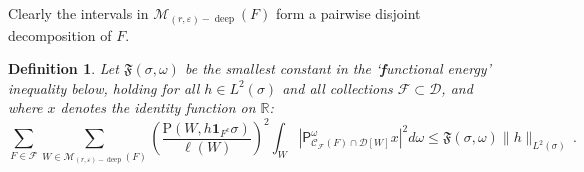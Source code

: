 \documentclass{amsart}%
\theoremstyle{plain}
\newtheorem{definition}[theorem]{Definition}
\numberwithin{equation}{section}
\begin{document}
Clearly the intervals in $\mathcal{M}_{\left(  r,\varepsilon\right)
-\operatorname*{deep}}\left(  F\right)  $ form a pairwise disjoint
decomposition of $F $.

\begin{definition}
Let $\mathfrak{F}\left(  \sigma,\omega\right)  $ be the smallest constant in
the `\textbf{f}unctional energy' inequality below, holding for all $h\in
L^{2}\left(  \sigma\right)  $ and all collections $\mathcal{F}\subset
\mathcal{D}$, and where $x$ denotes the identity function on $\mathbb{R}$:
\begin{equation}
\sum_{F\in\mathcal{F}}\sum_{W\in\mathcal{M}_{\left(  r,\varepsilon\right)
-\operatorname*{deep}}\left(  F\right)  }\left(  \frac{\mathrm{P}\left(
W,h\mathbf{1}_{F^{c}}\sigma\right)  }{\ell\left(  W\right)  }\right)  ^{2}%
\int_{W}\left\vert \mathsf{P}_{\mathcal{C}_{\mathcal{F}}\left(  F\right)
\cap\mathcal{D}\left[  W\right]  }^{\omega}x\right\vert ^{2}d\omega
\leq\mathfrak{F}\left(  \sigma,\omega\right)  \lVert h\rVert_{L^{2}\left(
\sigma\right)  }\,.\label{func ener}%
\end{equation}

\end{definition}
\end{document}
